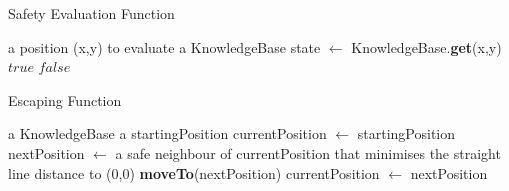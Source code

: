 \documentclass[11pt,a4paper]{article}
\begin{document}
\newpage

\begin{algorithm}
\caption{Safety Evaluation Function}
\label{isSafe}
\begin{algorithmic}[1]
\REQUIRE a position (x,y) to evaluate
\REQUIRE a KnowledgeBase
\STATE state $\leftarrow$ KnowledgeBase.\textbf{get}(x,y)
\RETURN $true$
\ELSE
\RETURN $false$
\ENDIF
\end{algorithmic}
\end{algorithm}

\begin{algorithm}
\caption{Escaping Function}
\label{escape}
\begin{algorithmic}[1]
\REQUIRE a KnowledgeBase
\REQUIRE a startingPosition
\STATE currentPosition $\leftarrow$ startingPosition
\REPEAT
\STATE nextPosition $\leftarrow$ a safe neighbour of currentPosition that minimises the straight line distance to (0,0)
\STATE \textbf{moveTo}(nextPosition)
\STATE currentPosition $\leftarrow$ nextPosition
\end{algorithmic}
\end{algorithm}
\end{document}
